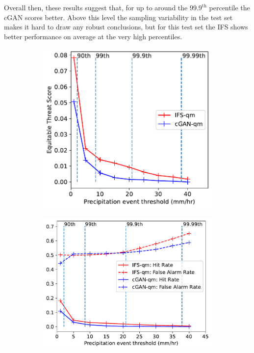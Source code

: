 \documentclass{article}
\begin{document}
Overall then, these results suggest that, for up to around the $99.9^{\text{th}}$ percentile the cGAN scores better. Above this level the sampling variability in the test set makes it hard to draw any robust conclusions, but for this test set the IFS shows better performance on average at the very high percentiles.



\begin{figure}[ht]
    \centering
     \begin{subfigure}[t]{0.45\textwidth}

     \includegraphics[width=\textwidth]{images/ets_final-nologs_217600.pdf}
     \caption{}
     \end{subfigure}
     \hfill
     \centering
     \begin{subfigure}[t]{0.49\textwidth}
     \includegraphics[width=\textwidth]{images/hit_rate_final-nologs_217600.pdf}

\end{subfigure}
\end{figure}
\end{document}
